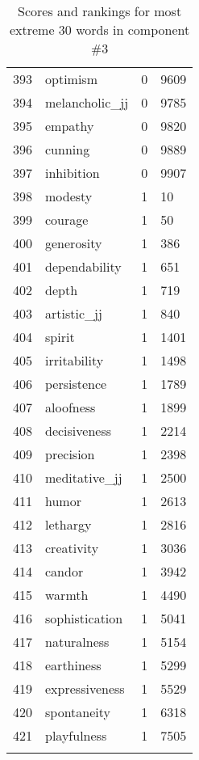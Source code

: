 \begin{longtable}[!htbp]{| rlr@{.}l |}
    393 & optimism & 0 & 9609 \\
    394 & melancholic\_jj & 0 & 9785 \\
    395 & empathy & 0 & 9820 \\
    396 & cunning & 0 & 9889 \\
    397 & inhibition & 0 & 9907 \\
    398 & modesty & 1 & 10 \\
    399 & courage & 1 & 50 \\
    400 & generosity & 1 & 386 \\
    401 & dependability & 1 & 651 \\
    402 & depth & 1 & 719 \\
    403 & artistic\_jj & 1 & 840 \\
    404 & spirit & 1 & 1401 \\
    405 & irritability & 1 & 1498 \\
    406 & persistence & 1 & 1789 \\
    407 & aloofness & 1 & 1899 \\
    408 & decisiveness & 1 & 2214 \\
    409 & precision & 1 & 2398 \\
    410 & meditative\_jj & 1 & 2500 \\
    411 & humor & 1 & 2613 \\
    412 & lethargy & 1 & 2816 \\
    413 & creativity & 1 & 3036 \\
    414 & candor & 1 & 3942 \\
    415 & warmth & 1 & 4490 \\
    416 & sophistication & 1 & 5041 \\
    417 & naturalness & 1 & 5154 \\
    418 & earthiness & 1 & 5299 \\
    419 & expressiveness & 1 & 5529 \\
    420 & spontaneity & 1 & 6318 \\
    421 & playfulness & 1 & 7505 \\
    \hline
    \caption{Scores and rankings for most extreme 30 words in component \#3} \\
\end{longtable}
